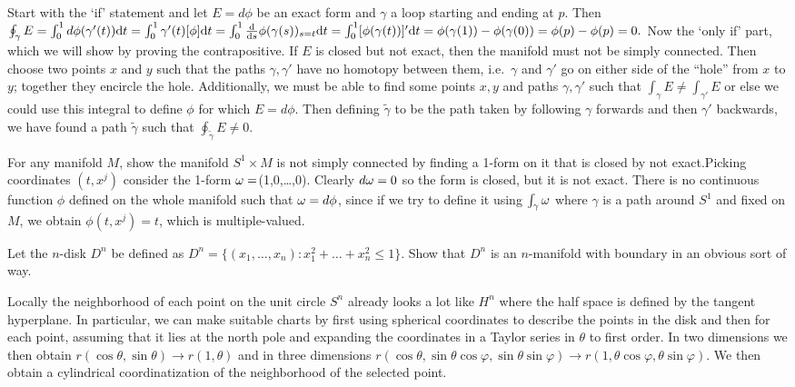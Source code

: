 {Start with the `if' statement and let $E=d\phi$ be an exact form and $\gamma$ a loop starting and ending at $p$. Then 
$\oint_\gamma E=\int_0^1 d\phi(\gamma'(t)){\rm d}t=\int_0^1\gamma'(t)[\phi]{\rm d}t=\int_0^1\frac{\rm d}{{\rm d}s}\phi(\gamma(s))_{s=t}{\rm d}t=\int_0^1[\phi(\gamma(t))]'{\rm d}t=\phi(\gamma(1))-\phi(\gamma(0))=\phi(p)-\phi(p)=0.$
Now the `only if' part, which we will show by proving the contrapositive.
If $E$ is closed but not exact, then the manifold must not be simply connected. Then choose two points $x$ and $y$ such that the paths $\gamma,\gamma'$ have no homotopy between them, i.e.~$\gamma$ and $\gamma'$ go on either side of the ``hole'' from $x$ to $y$; together they encircle the hole. Additionally, we must be able to
find some points $x,y$ and paths $\gamma,\gamma'$ such that $\int_\gamma E\neq \int_{\gamma'}E$ or else we could use this integral to define $\phi$ for which $E=d\phi$. 
Then defining $\tilde{\gamma}$ to be the path taken by following $\gamma$ forwards and then $\gamma'$ backwards, we have found a path $\tilde{\gamma}$ such that  $\oint_{\tilde{\gamma}} E\neq 0$.}

\begin{p}%
{For any manifold $M$, show the manifold $S^1\times M$ is not simply connected by finding a 1-form on it that is closed by not exact.}{Picking coordinates $(t,x^j)$ consider the 1-form $\omega=$(1,0,\dots,0). Clearly $d\omega=0$ so the form is
closed, but it is not exact. There is no continuous function $\phi$ defined on the whole manifold such that $\omega=d\phi$, since if we try to define it using $\int_\gamma \omega$ where
$\gamma$ is a path around $S^1$ and fixed on $M$, we obtain $\phi(t,x^j)=t$, which is multiple-valued.}
\end{p}

\begin{p}%
{Let the $n$-disk $D^n$ be defined as $D^n=\{(x_1,\dots,x_n):x_1^2+\dots+x_n^2\leq 1\}$. Show that $D^n$ is an $n$-manifold with
boundary in an obvious sort of way.}
\end{p}
{Locally the neighborhood of each point on the unit circle $S^n$ already looks a lot like $H^{n}$ where the half space is defined by the tangent hyperplane. In particular, we can make
suitable charts by first using spherical coordinates to describe the points in the disk and then for each point,
assuming that it lies at the north pole and expanding the coordinates in a Taylor series in $\theta$ to first order. In two dimensions we then obtain $r(\cos \theta,\sin\theta)\rightarrow r(1,\theta)$ and in three dimensions
$r(\cos\theta,\sin\theta\cos\varphi,\sin\theta\sin\varphi)\rightarrow r(1,\theta\cos\varphi,\theta\sin\varphi)$. We then obtain a cylindrical coordinatization of the neighborhood of the selected point.}

